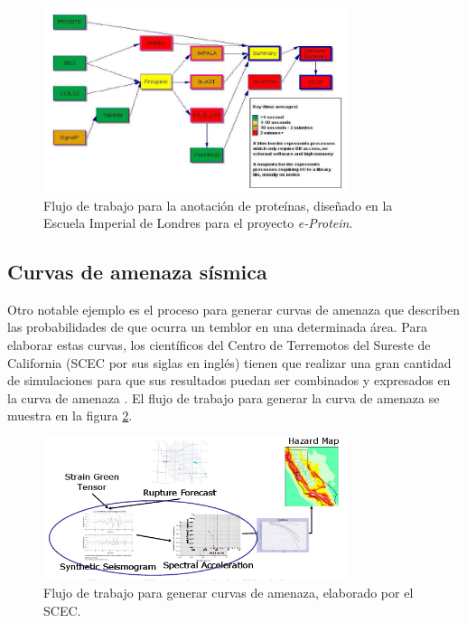 \documentclass[letterpaper, 12pt]{report}
\begin{document}
\begin{figure}
    \begin{center}
        \includegraphics[width=0.8\textwidth]{imagenes/iceni-workflow}
    \end{center}
    \caption{Flujo de trabajo para la anotación de proteínas, diseñado en la Escuela Imperial de Londres para el proyecto \emph{e-Protein}.}
    \label{fig:iceni-workflow}
\end{figure}


\subsection{Curvas de amenaza sísmica}
Otro notable ejemplo es el proceso para generar curvas de amenaza que describen las probabilidades de que ocurra un temblor en una determinada área. Para elaborar estas curvas, los científicos del Centro de Terremotos del Sureste de California (SCEC por sus siglas en inglés) tienen que realizar una gran cantidad de simulaciones para que sus resultados puedan ser combinados y expresados en la curva de amenaza \cite{deelman2006managing}. El flujo de trabajo para generar la curva de amenaza se muestra en la figura \ref{fig:scec-workflow}.

\begin{figure}
    \begin{center}
        \includegraphics[width=0.8\textwidth]{imagenes/scec-workflow}
    \end{center}
    \caption{Flujo de trabajo para generar curvas de amenaza, elaborado por el SCEC.}
    \label{fig:scec-workflow}
\end{figure}
\end{document}
